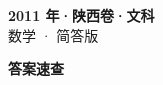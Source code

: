 \documentclass[zihao=-4, a4paper]{ctexart}
\begin{document}
\begin{center}
  {\Large\bfseries 2011 年·陕西卷·文科}\\[4pt]
  {\large 数学 · 简答版}
\end{center}
\medskip
{}

\clearpage
{}
\begin{center}{\Large\bfseries 答案速查}\end{center}
\medskip

\end{document}

